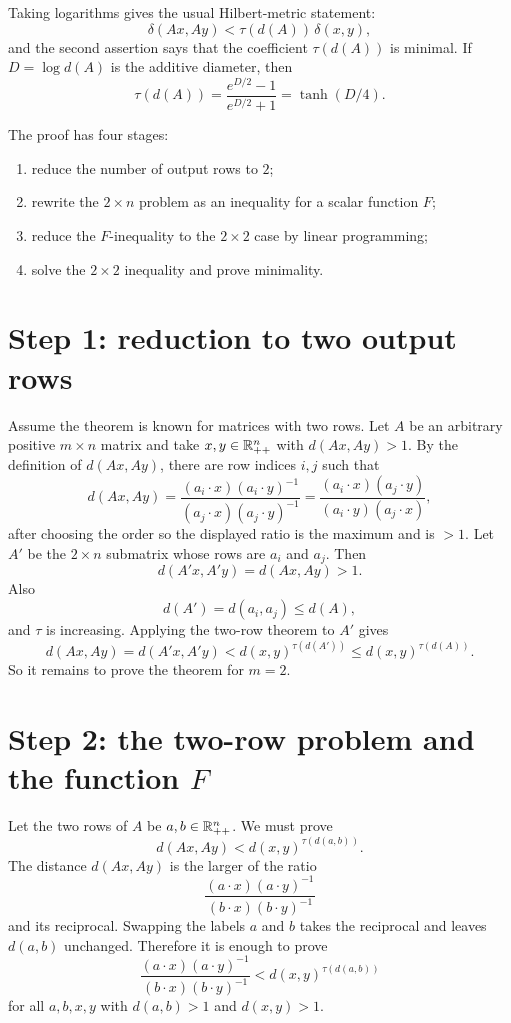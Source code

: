 Taking logarithms gives the usual Hilbert-metric statement:
\[
  \delta(Ax,Ay)<\tau(d(A))\,\delta(x,y),
\]
and the second assertion says that the coefficient $\tau(d(A))$ is minimal.  If
$D=\log d(A)$ is the additive diameter, then
\[
  \tau(d(A))=\frac{e^{D/2}-1}{e^{D/2}+1}=\tanh(D/4).
\]

The proof has four stages:
\begin{enumerate}[leftmargin=2em]
\item reduce the number of output rows to $2$;
\item rewrite the $2\times n$ problem as an inequality for a scalar function $F$;
\item reduce the $F$-inequality to the $2\times2$ case by linear programming;
\item solve the $2\times2$ inequality and prove minimality.
\end{enumerate}

\section*{Step 1: reduction to two output rows}
Assume the theorem is known for matrices with two rows.  Let $A$ be an arbitrary
positive $m\times n$ matrix and take $x,y\in\mathbb{R}^n_{++}$ with $d(Ax,Ay)>1$.
By the definition of $d(Ax,Ay)$, there are row indices $i,j$ such that
\[
  d(Ax,Ay)
  =\frac{(a_i\cdot x)(a_i\cdot y)^{-1}}
         {(a_j\cdot x)(a_j\cdot y)^{-1}}
  = \frac{(a_i\cdot x)(a_j\cdot y)}{(a_i\cdot y)(a_j\cdot x)},
\]
after choosing the order so the displayed ratio is the maximum and is $>1$.
Let $A'$ be the $2\times n$ submatrix whose rows are $a_i$ and $a_j$.  Then
\[
  d(A'x,A'y)=d(Ax,Ay)>1.
\]
Also
\[
  d(A')=d(a_i,a_j)\le d(A),
\]
and $\tau$ is increasing.  Applying the two-row theorem to $A'$ gives
\[
  d(Ax,Ay)=d(A'x,A'y)
  <d(x,y)^{\tau(d(A'))}
  \le d(x,y)^{\tau(d(A))}.
\]
So it remains to prove the theorem for $m=2$.

\section*{Step 2: the two-row problem and the function $F$}
Let the two rows of $A$ be $a,b\in\mathbb{R}^n_{++}$.  We must prove
\[
  d(Ax,Ay)<d(x,y)^{\tau(d(a,b))}.
\]
The distance $d(Ax,Ay)$ is the larger of the ratio
\[
  \frac{(a\cdot x)(a\cdot y)^{-1}}{(b\cdot x)(b\cdot y)^{-1}}
\]
and its reciprocal.  Swapping the labels $a$ and $b$ takes the reciprocal and leaves
$d(a,b)$ unchanged.  Therefore it is enough to prove
\[
  \frac{(a\cdot x)(a\cdot y)^{-1}}{(b\cdot x)(b\cdot y)^{-1}}
  <d(x,y)^{\tau(d(a,b))}
\]
for all $a,b,x,y$ with $d(a,b)>1$ and $d(x,y)>1$.


